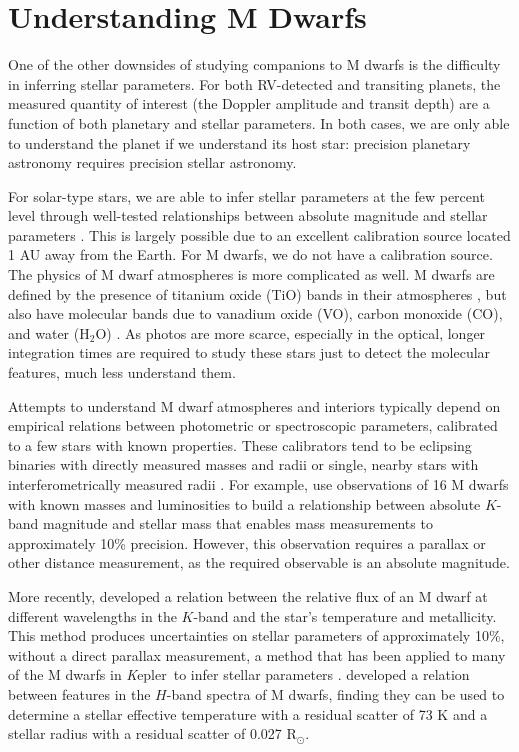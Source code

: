 \documentclass[12pt]{caltech_thesis}
\newcommand{\rsun}{{R$_\odot$}}
\newcommand{\kep}{{\textit Kepler}}
\begin{document}
\section{Understanding M Dwarfs}
One of the other downsides of studying companions to M dwarfs is the difficulty 
in inferring stellar parameters.
For both RV-detected and transiting planets, the measured quantity of interest 
(the Doppler amplitude and transit depth) are a function of both planetary and stellar
parameters. 
In both cases, we are only able to understand the planet if we understand its host star:
precision planetary astronomy requires precision stellar astronomy.

For solar-type stars, we are able to infer stellar parameters at the few percent level
through well-tested relationships between absolute magnitude and stellar parameters
\citep{Andersen91, Casagrande10}.
This is largely possible due to an excellent calibration source located 1 AU away from the 
Earth.
For M dwarfs, we do not have a calibration source.
The physics of M dwarf atmospheres is more complicated as well.
M dwarfs are defined by the presence of titanium oxide (TiO) bands in their
atmospheres \citep{Kuiper38, Morgan38}, but also have molecular bands due to
vanadium oxide (VO), carbon monoxide (CO), and water (H$_2$O) \citep[e.g.][]{Mould75, Muirhead12b}.
As photos are more scarce, especially in the optical, longer integration times are 
required to study these stars just to detect the molecular features, much less
understand them.


Attempts to understand M dwarf atmospheres and interiors typically depend on empirical 
relations between photometric or spectroscopic parameters, calibrated to a few stars
with known properties.
These calibrators tend to be eclipsing binaries with directly measured masses and radii 
\citet{Birkby12} or single, nearby stars with interferometrically measured radii \citep{Boyajian12}.
For example, \citet{Delfosse00} use observations of 16 M dwarfs with known masses and
luminosities to build a relationship between absolute $K$-band magnitude and stellar mass
that enables mass measurements to approximately 10\% precision.
However, this observation requires a parallax or other distance measurement, as the
required observable is an absolute magnitude.

More recently, \citet{RojasAyala12} developed a relation between the relative flux
of an M dwarf at different wavelengths in the $K$-band and the star's temperature
and metallicity.
This method produces uncertainties on stellar parameters of approximately 10\%, without
a direct parallax measurement, a method that has been applied to many of the M dwarfs
in \kep\ to infer stellar parameters \citep{Muirhead12b, Muirhead14}.
\citet{Newton15} developed a relation between features in the $H$-band spectra of M dwarfs,
finding they can be used to determine a stellar effective temperature with a residual
scatter of 73 K and a stellar radius with a residual scatter of 0.027 \rsun.
\end{document}
